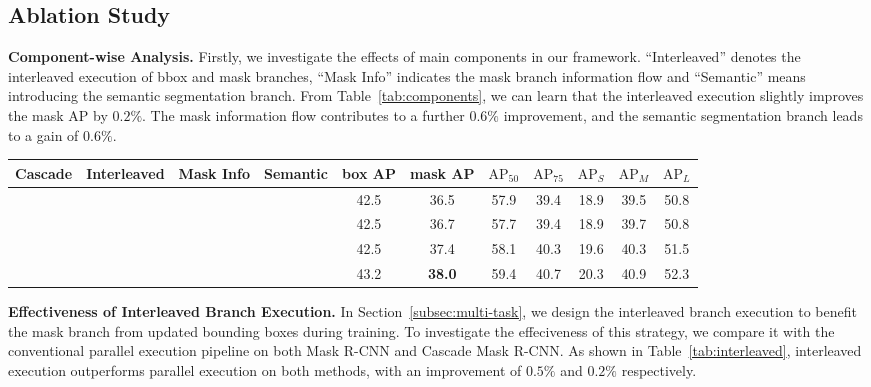 \documentclass[10pt,twocolumn,letterpaper]{article}
\begin{document}
\subsection{Ablation Study}

\noindent\textbf{Component-wise Analysis.}
Firstly, we investigate the effects of main components in our framework.
``Interleaved'' denotes the interleaved execution of bbox and mask branches,
``Mask Info'' indicates the mask branch information flow and
``Semantic'' means introducing the semantic segmentation branch.
From Table~\ref{tab:components}, we can learn that the interleaved execution
slightly improves the mask AP by $0.2\%$.
The mask information flow contributes to a further $0.6\%$ improvement,
and the semantic segmentation branch leads to a gain of $0.6\%$.


\begin{table*}[htb]
	\centering
	\caption{Effects of each component in our design. Results are reported on COCO 2017 val.}
	\begin{tabular}{*{4}{c}|*{7}{c}}
		\toprule
		Cascade    & Interleaved & Mask Info  & Semantic   & box AP & mask AP & $\text{AP}_{50}$ & $\text{AP}_{75}$ & $\text{AP}_{S}$ & $\text{AP}_{M}$ & $\text{AP}_{L}$ \\
		\hline
		\checkmark &             &            &            & 42.5   & 36.5    & 57.9             & 39.4             & 18.9            & 39.5            & 50.8           \\
		\checkmark & \checkmark  &            &            & 42.5   & 36.7    & 57.7             & 39.4             & 18.9            & 39.7            & 50.8           \\
		\checkmark & \checkmark  & \checkmark &            & 42.5   & 37.4    & 58.1             & 40.3             & 19.6            & 40.3            & 51.5           \\
		\checkmark & \checkmark  & \checkmark & \checkmark & 43.2   & \textbf{38.0}    & 59.4             & 40.7             & 20.3            & 40.9            & 52.3           \\
		\bottomrule
	\end{tabular}
	\label{tab:components}
\end{table*}

\noindent\textbf{Effectiveness of Interleaved Branch Execution.}
In Section~\ref{subsec:multi-task}, we design the interleaved branch execution
to benefit the mask branch from updated bounding boxes during training.
To investigate the effeciveness of this strategy, we compare it with the
conventional parallel execution pipeline on both Mask R-CNN and Cascade Mask R-CNN.
As shown in Table~\ref{tab:interleaved}, interleaved execution outperforms 
parallel execution on both methods, with an improvement of $0.5\%$ and $0.2\%$
respectively.
\end{document}
